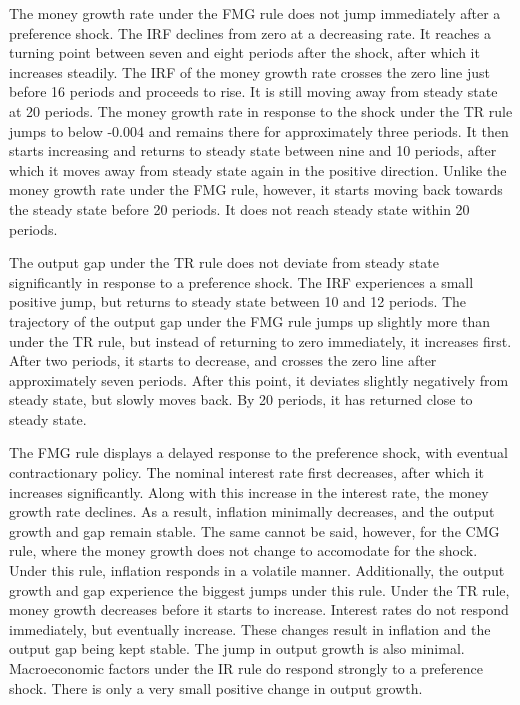 \documentclass[11pt,preprint, authoryear]{elsarticle}
\numberwithin{equation}{section}
\numberwithin{figure}{section}
\numberwithin{table}{section}
\begin{document}
The money growth rate under the FMG rule does not jump immediately after
a preference shock. The IRF declines from zero at a decreasing rate. It
reaches a turning point between seven and eight periods after the shock,
after which it increases steadily. The IRF of the money growth rate
crosses the zero line just before 16 periods and proceeds to rise. It is
still moving away from steady state at 20 periods. The money growth rate
in response to the shock under the TR rule jumps to below -0.004 and
remains there for approximately three periods. It then starts increasing
and returns to steady state between nine and 10 periods, after which it
moves away from steady state again in the positive direction. Unlike the
money growth rate under the FMG rule, however, it starts moving back
towards the steady state before 20 periods. It does not reach steady
state within 20 periods.

The output gap under the TR rule does not deviate from steady state
significantly in response to a preference shock. The IRF experiences a
small positive jump, but returns to steady state between 10 and 12
periods. The trajectory of the output gap under the FMG rule jumps up
slightly more than under the TR rule, but instead of returning to zero
immediately, it increases first. After two periods, it starts to
decrease, and crosses the zero line after approximately seven periods.
After this point, it deviates slightly negatively from steady state, but
slowly moves back. By 20 periods, it has returned close to steady state.

The FMG rule displays a delayed response to the preference shock, with
eventual contractionary policy. The nominal interest rate first
decreases, after which it increases significantly. Along with this
increase in the interest rate, the money growth rate declines. As a
result, inflation minimally decreases, and the output growth and gap
remain stable. The same cannot be said, however, for the CMG rule, where
the money growth does not change to accomodate for the shock. Under this
rule, inflation responds in a volatile manner. Additionally, the output
growth and gap experience the biggest jumps under this rule. Under the
TR rule, money growth decreases before it starts to increase. Interest
rates do not respond immediately, but eventually increase. These changes
result in inflation and the output gap being kept stable. The jump in
output growth is also minimal. Macroeconomic factors under the IR rule
do respond strongly to a preference shock. There is only a very small
positive change in output growth.
\end{document}
